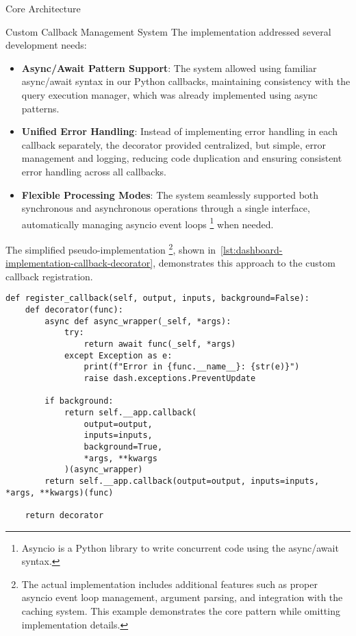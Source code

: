 \begin{section}{Core Architecture}
\begin{subsection}{Custom Callback Management System}
		The implementation addressed several development needs:
		\begin{itemize}
			\item \textbf{Async/Await Pattern Support}: The system allowed using familiar async/await syntax in our Python callbacks, maintaining consistency with the query execution manager, which was already implemented using async
			patterns.
			\item \textbf{Unified Error Handling}: Instead of implementing error handling in each callback separately, the decorator provided centralized, but simple, error management and logging, reducing code duplication and ensuring
			consistent error handling across all callbacks.
			\item \textbf{Flexible Processing Modes}: The system seamlessly supported both synchronous and asynchronous operations through a single interface, automatically managing asyncio event loops
			\footnote{Asyncio is a Python library to write concurrent code using the async/await syntax\cite{psf_library_asyncio}.} when needed.
		\end{itemize}

		The simplified pseudo-implementation
		\footnote{
			The actual implementation includes additional features such as proper asyncio event loop management, argument parsing, and integration with the caching system.
			This example demonstrates the core pattern while omitting implementation details.}, shown in~\autoref{lst:dashboard-implementation-callback-decorator}, demonstrates this approach to the custom callback registration.

		\begin{listing}[H]
			\caption{Custom Callback Decorator Implementation}
			\begin{verbatim}
def register_callback(self, output, inputs, background=False):
	def decorator(func):
		async def async_wrapper(_self, *args):
			try:
				return await func(_self, *args)
			except Exception as e:
				print(f"Error in {func.__name__}: {str(e)}")
				raise dash.exceptions.PreventUpdate

		if background:
			return self.__app.callback(
				output=output,
				inputs=inputs,
				background=True,
				*args, **kwargs
			)(async_wrapper)
		return self.__app.callback(output=output, inputs=inputs, *args, **kwargs)(func)

	return decorator
			\end{verbatim}
			\label{lst:dashboard-implementation-callback-decorator}
		\end{listing}


\end{subsection}
\end{section}
